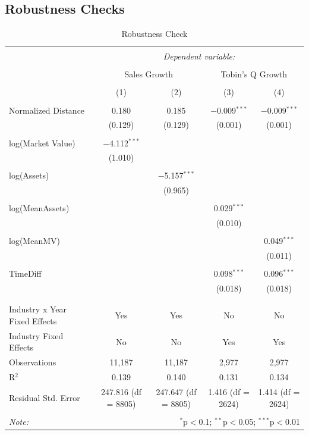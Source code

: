 \documentclass[
]{article}
\begin{document}
\newpage{}

\subsection{Robustness Checks}\label{robustness-checks}

\begin{table}[!htbp] \centering 
  \caption{Robustness Check} 
  \label{} 
\begin{tabular}{@{\extracolsep{5pt}}lcccc} 
\\[-1.8ex]\hline 
\hline \\[-1.8ex] 
 & \multicolumn{4}{c}{\textit{Dependent variable:}} \\ 
\cline{2-5} 
\\[-1.8ex] & \multicolumn{2}{c}{Sales Growth} & \multicolumn{2}{c}{Tobin's Q Growth} \\ 
\\[-1.8ex] & (1) & (2) & (3) & (4)\\ 
\hline \\[-1.8ex] 
 Normalized Distance & 0.180 & 0.185 & $-$0.009$^{***}$ & $-$0.009$^{***}$ \\ 
  & (0.129) & (0.129) & (0.001) & (0.001) \\ 
  & & & & \\ 
 log(Market Value) & $-$4.112$^{***}$ &  &  &  \\ 
  & (1.010) &  &  &  \\ 
  & & & & \\ 
 log(Assets) &  & $-$5.157$^{***}$ &  &  \\ 
  &  & (0.965) &  &  \\ 
  & & & & \\ 
 log(MeanAssets) &  &  & 0.029$^{***}$ &  \\ 
  &  &  & (0.010) &  \\ 
  & & & & \\ 
 log(MeanMV) &  &  &  & 0.049$^{***}$ \\ 
  &  &  &  & (0.011) \\ 
  & & & & \\ 
 TimeDiff &  &  & 0.098$^{***}$ & 0.096$^{***}$ \\ 
  &  &  & (0.018) & (0.018) \\ 
  & & & & \\ 
\hline \\[-1.8ex] 
Industry x Year Fixed Effects & Yes & Yes & No & No \\ 
Industry Fixed Effects & No & No & Yes & Yes \\ 
Observations & 11,187 & 11,187 & 2,977 & 2,977 \\ 
R$^{2}$ & 0.139 & 0.140 & 0.131 & 0.134 \\ 
Residual Std. Error & 247.816 (df = 8805) & 247.647 (df = 8805) & 1.416 (df = 2624) & 1.414 (df = 2624) \\ 
\hline 
\hline \\[-1.8ex] 
\textit{Note:}  & \multicolumn{4}{r}{$^{*}$p$<$0.1; $^{**}$p$<$0.05; $^{***}$p$<$0.01} \\ 
\end{tabular} 
\end{table}
\end{document}

